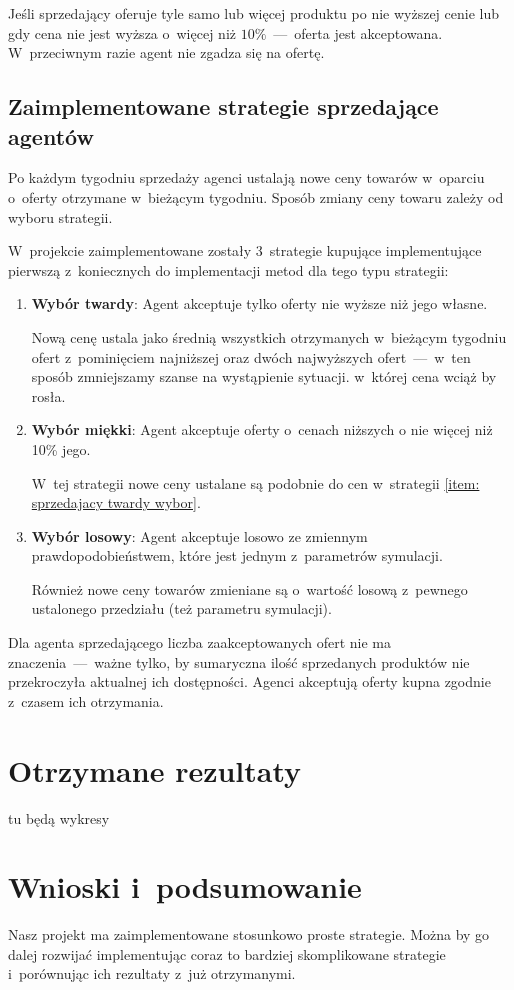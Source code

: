\documentclass[12pt]{article}
\begin{document}
Jeśli sprzedający oferuje tyle samo
lub więcej produktu po nie wyższej cenie lub gdy cena nie jest wyższa o~więcej niż $10\%$~---~oferta jest akceptowana. W~przeciwnym razie agent nie zgadza się na ofertę.

\subsection{Zaimplementowane strategie sprzedające agentów}
Po każdym tygodniu sprzedaży agenci ustalają nowe ceny towarów w~oparciu o~oferty otrzymane w~bieżącym tygodniu. Sposób zmiany ceny towaru zależy od wyboru strategii.

W~projekcie zaimplementowane zostały 3~strategie kupujące implementujące pierwszą z~koniecznych do implementacji metod dla tego typu strategii:
\begin{enumerate}
 \item \label{item: sprzedajacy twardy wybor} \textbf{Wybór twardy}: Agent akceptuje tylko oferty nie wyższe niż jego własne.

Nową cenę ustala jako średnią wszystkich otrzymanych w~bieżącym tygodniu ofert z~pominięciem najniższej oraz dwóch najwyższych ofert~---~w~ten sposób zmniejszamy szanse na wystąpienie sytuacji. w~której cena 
wciąż by rosła.
 \item \textbf{Wybór miękki}: Agent akceptuje oferty o~cenach niższych o nie więcej niż 10\% jego.

W~tej strategii nowe ceny ustalane są podobnie do cen w~strategii \ref{item: sprzedajacy twardy wybor}.

 \item \textbf{Wybór losowy}: Agent akceptuje losowo ze zmiennym prawdopodobieństwem, które jest jednym z~parametrów symulacji.

Również nowe ceny towarów zmieniane są o~wartość losową z~pewnego ustalonego przedziału (też parametru symulacji).
\end{enumerate}

Dla agenta sprzedającego liczba zaakceptowanych ofert nie ma znaczenia~---~ważne tylko, by sumaryczna ilość sprzedanych produktów nie przekroczyła aktualnej ich dostępności. Agenci akceptują oferty kupna
zgodnie z~czasem ich otrzymania.

\section{Otrzymane rezultaty}\label{chapter: rezultaty}
tu będą wykresy
\section{Wnioski i~podsumowanie}
Nasz projekt ma zaimplementowane stosunkowo proste strategie. Można by go dalej rozwijać implementując coraz to bardziej skomplikowane strategie i~porównując ich rezultaty z~już otrzymanymi.
\end{document}
